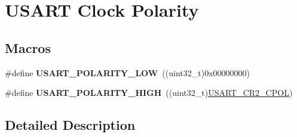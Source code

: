 \hypertarget{group___u_s_a_r_t___clock___polarity}{}\section{U\+S\+A\+RT Clock Polarity}
\label{group___u_s_a_r_t___clock___polarity}
\subsection*{Macros}
\begin{DoxyCompactItemize}
\item 
\#define {\bfseries U\+S\+A\+R\+T\+\_\+\+P\+O\+L\+A\+R\+I\+T\+Y\+\_\+\+L\+OW}~((uint32\+\_\+t)0x00000000)\hypertarget{group___u_s_a_r_t___clock___polarity_ga5afb62c05704ca0e750ca8f4bb5ccc7d}{}\label{group___u_s_a_r_t___clock___polarity_ga5afb62c05704ca0e750ca8f4bb5ccc7d}

\item 
\#define {\bfseries U\+S\+A\+R\+T\+\_\+\+P\+O\+L\+A\+R\+I\+T\+Y\+\_\+\+H\+I\+GH}~((uint32\+\_\+t)\hyperlink{group___peripheral___registers___bits___definition_gafbb4336ac93d94d4e78f9fb7b3a0dc68}{U\+S\+A\+R\+T\+\_\+\+C\+R2\+\_\+\+C\+P\+OL})\hypertarget{group___u_s_a_r_t___clock___polarity_ga3b3e3d798d4797a220346f6b14d257ee}{}\label{group___u_s_a_r_t___clock___polarity_ga3b3e3d798d4797a220346f6b14d257ee}

\end{DoxyCompactItemize}


\subsection{Detailed Description}
